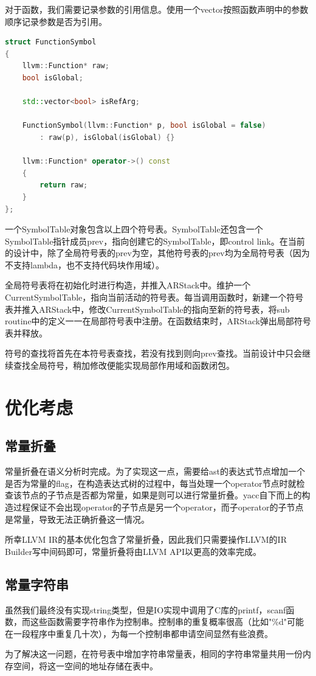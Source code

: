 \documentclass{article}
\begin{document}
\par 对于函数，我们需要记录参数的引用信息。使用一个vector按照函数声明中的参数顺序记录参数是否为引用。
\begin{lstlisting}[language=C++]
struct FunctionSymbol
{
    llvm::Function* raw;
    bool isGlobal;

    std::vector<bool> isRefArg;

    FunctionSymbol(llvm::Function* p, bool isGlobal = false)
        : raw(p), isGlobal(isGlobal) {}

    llvm::Function* operator->() const
    {
        return raw;
    }
};
\end{lstlisting}

\par 一个SymbolTable对象包含以上四个符号表。SymbolTable还包含一个SymbolTable指针成员prev，指向创建它的SymbolTable，即control link。在当前的设计中，除了全局符号表的prev为空，其他符号表的prev均为全局符号表（因为不支持lambda，也不支持代码块作用域）。
\par 全局符号表将在初始化时进行构造，并推入ARStack中。维护一个CurrentSymbolTable，指向当前活动的符号表。每当调用函数时，新建一个符号表并推入ARStack中，修改CurrentSymbolTable的指向至新的符号表，将sub routine中的定义一一在局部符号表中注册。在函数结束时，ARStack弹出局部符号表并释放。
\par 符号的查找将首先在本符号表查找，若没有找到则向prev查找。当前设计中只会继续查找全局符号，稍加修改便能实现局部作用域和函数闭包。

\newpage
\section{优化考虑}

\subsection{常量折叠}
\par 常量折叠在语义分析时完成。为了实现这一点，需要给ast的表达式节点增加一个是否为常量的flag，在构造表达式树的过程中，每当处理一个operator节点时就检查该节点的子节点是否都为常量，如果是则可以进行常量折叠。yacc自下而上的构造过程保证不会出现operator的子节点是另一个operator，而子operator的子节点是常量，导致无法正确折叠这一情况。
\par 所幸LLVM IR的基本优化包含了常量折叠，因此我们只需要操作LLVM的IR Builder写中间码即可，常量折叠将由LLVM API以更高的效率完成。

\subsection{常量字符串}
\par 虽然我们最终没有实现string类型，但是IO实现中调用了C库的printf，scanf函数，而这些函数需要字符串作为控制串。控制串的重复概率很高（比如"\%d"可能在一段程序中重复几十次），为每一个控制串都申请空间显然有些浪费。
\par 为了解决这一问题，在符号表中增加字符串常量表，相同的字符串常量共用一份内存空间，将这一空间的地址存储在表中。
\end{document}
